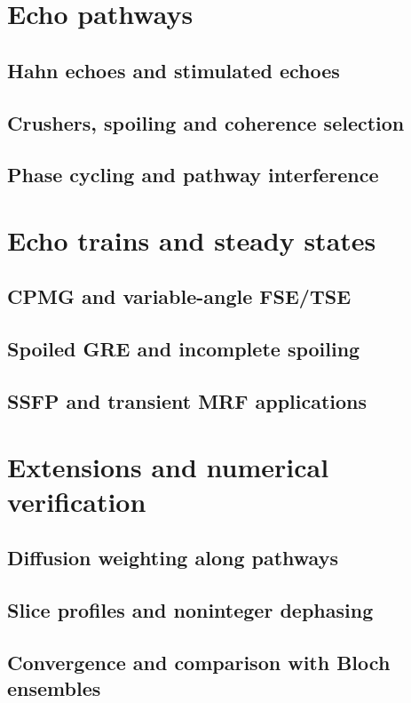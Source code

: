 \section{Echo pathways}
\label{sec:13:echo-pathways}
\subsection{Hahn echoes and stimulated echoes}
\subsection{Crushers, spoiling and coherence selection}
\subsection{Phase cycling and pathway interference}

\section{Echo trains and steady states}
\label{sec:13:echo-trains-and-steady-states}
\subsection{CPMG and variable-angle FSE/TSE}
\subsection{Spoiled GRE and incomplete spoiling}
\subsection{SSFP and transient MRF applications}

\section{Extensions and numerical verification}
\label{sec:13:extensions-and-numerical-verification}
\subsection{Diffusion weighting along pathways}
\subsection{Slice profiles and noninteger dephasing}
\subsection{Convergence and comparison with Bloch ensembles}

